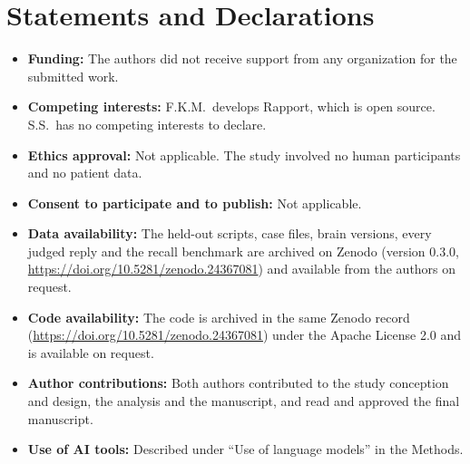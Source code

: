 \documentclass[sn-basic,Numbered]{sn-jnl}
\begin{document}
\section*{Statements and Declarations}
\begin{itemize}
\item \textbf{Funding:} The authors did not receive support from any organization for the submitted work.
\item \textbf{Competing interests:} F.K.M.\ develops Rapport, which is open source. S.S.\ has no competing interests to declare.
\item \textbf{Ethics approval:} Not applicable. The study involved no human participants and no patient data.
\item \textbf{Consent to participate and to publish:} Not applicable.
\item \textbf{Data availability:} The held-out scripts, case files, brain versions, every judged reply and the recall benchmark are archived on
Zenodo (version 0.3.0, \url{https://doi.org/10.5281/zenodo.24367081}) and available from the authors on request.
\item \textbf{Code availability:} The code is archived in the same Zenodo record (\url{https://doi.org/10.5281/zenodo.24367081}) under the Apache License 2.0 and is available on
request.
\item \textbf{Author contributions:} Both authors contributed to the study conception and design, the analysis and the manuscript, and
read and approved the final manuscript.
\item \textbf{Use of AI tools:} Described under ``Use of language models'' in the Methods.
\end{itemize}


\end{document}
